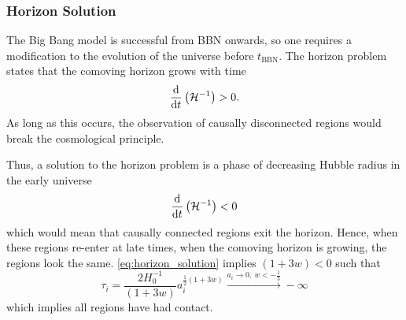 \subsubsection{Horizon Solution}

The Big Bang model is successful from BBN onwards, so one requires a modification to the evolution of the universe before \(t_{\text{BBN}}\).
The horizon problem states that the comoving horizon grows with time
%
\begin{equation}
	\dv{t} \left(\mathcal{H}^{-1}\right)
	> 0.
\end{equation}
%
As long as this occurs, the observation of causally disconnected regions would break the cosmological principle.

Thus, a solution to the horizon problem is a phase of decreasing Hubble radius in the early universe
%
\begin{equation}\label{eq:horizon_solution}
	\dv{t} \left(\mathcal{H}^{-1}\right)
	< 0
\end{equation}
%
which would mean that causally connected regions exit the horizon.
Hence, when these regions re-enter at late times, when the comoving horizon is growing, the regions look the same.
\cref{eq:horizon_solution} implies \((1+3w) < 0\) such that
%
\begin{equation}
	\tau_{i} = \frac{2H_{0}^{-1}}{(1+3w)} a_{i}^{\frac{1}{2}(1+3w)} \xrightarrow{a_{i} \rightarrow 0,\ w < -\frac{1}{3}} -\infty
\end{equation}
%
which implies all regions have had contact.

